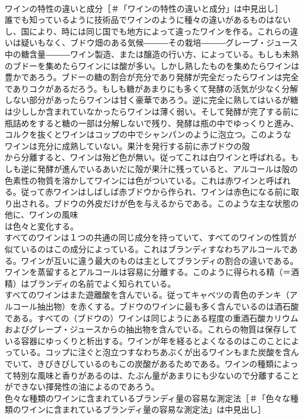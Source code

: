 \documentclass[8pt]{extreport}
\begin{document}
\begin{CJK}{UTF8}{min}
\\	ワインの特性の違いと成分［＃「ワインの特性の違いと成分」は中見出し］
\\	誰でも知っているように技術品でワインのように種々の違いがあるものはないし、国により、時には同じ国でも地方によって違ったワインを作る。これらの違いは疑いもなく、ブドウ畑のある気候―――その栽培―――グレープ・ジュース中の糖含量―――ワイン製造、または醸造の行い方、によっている。もしも未熟のブドーを集めたらワインには酸が多い。しかし熟したものを集めたらワインは豊かであろう。ブドーの糖の割合が充分であり発酵が完全だったらワインは完全でありコクがあるだろう。もしも糖があまりにも多くて発酵の活気が少なく分解しない部分があったらワインは甘く豪華であろう。逆に完全に熟してはいるが糖は少ししか含まれていなかったらワインは薄く弱い。そして発酵が完了する前に瓶詰めをすると糖の一部は分解しないで残り、発酵は瓶の中でゆっくりと進み、コルクを抜くとワインはコップの中でシャンパンのように泡立つ。このようなワインは充分に成熟していない。果汁を発行する前に赤ブドウの殻
\\	から分離すると、ワインは殆ど色が無い。従ってこれは白ワインと呼ばれる。もしも逆に発酵が進んでいるあいだに殻が果汁に残っていると、アルコールは殻の色素性の物質を溶かしてワインには色がついている。これは赤ワインと呼ばれる。従って赤ワインはしばしば赤ブドウから作られ、ワインは赤色になる前に取り出される。ブドウの外皮だけが色を与えるからである。このような主な状態の他に、ワインの風味
\\	は色々と変化する。
\\	すべてのワインは１つの共通の同じ成分を持っていて、すべてのワインの性質が似ているのはこの成分によっている。これはブランディすなわちアルコールである。ワインが互いに違う最大のものは主としてブランディの割合の違いである。ワインを蒸留するとアルコールは容易に分離する。このように得られる精（＝酒精）はブランディの名前でよく知られている。
\\	すべてのワインはまた遊離酸を含んでいる。従ってキャベツの青色のチンキ（アルコール抽出物）を赤くする。ブドウのワインに最も多く含んでいるのは酒石酸である。すべての（ブドウの）ワインは同じようにある程度の重酒石酸カリウムおよびグレープ・ジュースからの抽出物を含んでいる。これらの物質は保存している容器にゆっくりと析出する。ワインが年を経るとよくなるのはこのことによっている。コップに注ぐと泡立つすなわちあぶくが出るワインもまた炭酸を含んでいて、きびきびしているのもこの炭酸があるためである。ワインの種類によって特別な風味と香りがあるのは、たぶん量があまりにも少ないので分離することができない揮発性の油によるのであろう。
\\	色々な種類のワインに含まれているブランディ量の容易な測定法［＃「色々な種類のワインに含まれているブランディ量の容易な測定法」は中見出し］

\end{CJK}
\end{document}
